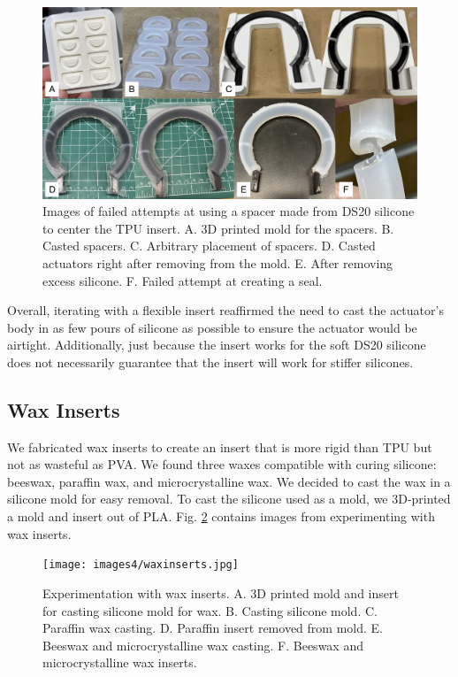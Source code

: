 \begin{figure}[ht!]
    \centering
    \includegraphics[width=5.5 in]{images4/ds20spacer.jpg}
    \caption{Images of failed attempts at using a spacer made from DS20 silicone to center the TPU insert. A. 3D printed mold for the spacers. B. Casted spacers. C. Arbitrary placement of spacers. D. Casted actuators right after removing from the mold. E. After removing excess silicone. F. Failed attempt at creating a seal.}
    \label{fig:ds20spacer}
\end{figure}

Overall, iterating with a flexible insert reaffirmed the need to cast the actuator's body in as few pours of silicone as possible to ensure the actuator would be airtight. Additionally, just because the insert works for the soft DS20 silicone does not necessarily guarantee that the insert will work for stiffer silicones. 

\clearpage
\subsection{Wax Inserts}

We fabricated wax inserts to create an insert that is more rigid than TPU but not as wasteful as PVA. We found three waxes compatible with curing silicone: beeswax, paraffin wax, and microcrystalline wax. We decided to cast the wax in a silicone mold for easy removal. To cast the silicone used as a mold, we 3D-printed a mold and insert out of PLA. Fig. \ref{fig:waxinserts} contains images from experimenting with wax inserts. 

\begin{figure}[ht!]
    \centering
    \texttt{[image: images4/waxinserts.jpg]}
    \caption{Experimentation with wax inserts. A. 3D printed mold and insert for casting silicone mold for wax. B. Casting silicone mold. C. Paraffin wax casting. D. Paraffin insert removed from mold. E. Beeswax and microcrystalline wax casting. F. Beeswax and microcrystalline wax inserts.}
    \label{fig:waxinserts}
\end{figure}

